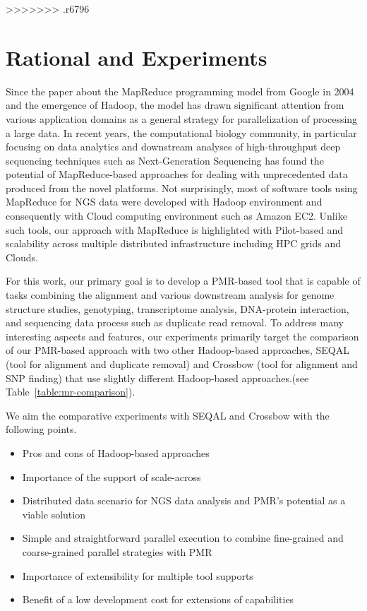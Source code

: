 \documentclass{sig-alternate}
\begin{document}
>>>>>>> .r6796
\section{Rational and Experiments}\label{sec:experiments}



Since the paper about the MapReduce programming model from Google in 2004\cite{mapreduce-2004-dean} and the emergence of Hadoop, the model has drawn significant attention from various application domains as a general strategy for parallelization of processing a large data.  In recent years, the computational biology community, in particular focusing on data analytics and downstream analyses of high-throughput deep sequencing techniques such as Next-Generation Sequencing has found the potential of MapReduce-based approaches for dealing with unprecedented data produced from the novel platforms\cite{schatz-nature-biotech-2010}.  Not surprisingly, most of software tools using MapReduce for NGS data were developed with Hadoop environment and consequently with Cloud computing environment such as Amazon EC2.  Unlike such tools, our approach with MapReduce is highlighted with Pilot-based and scalability across multiple distributed infrastructure including HPC grids and Clouds.  

For this work, our primary goal is to develop a PMR-based tool that is capable of tasks combining the alignment and various downstream analysis for genome structure studies, genotyping, transcriptome analysis, DNA-protein interaction, and sequencing data process such as duplicate read removal.  To address many interesting aspects and features, our experiments primarily target the comparison of our PMR-based approach with two other Hadoop-based approaches, SEQAL (tool for alignment and duplicate removal) and Crossbow (tool for alignment and SNP finding) that use slightly different Hadoop-based approaches.(see Table~\ref{table:mr-comparison}).  

We aim the comparative experiments with SEQAL and Crossbow with the following points.
\begin{itemize}
\item Pros and cons of Hadoop-based approaches
\item Importance of the support of scale-across 
\item Distributed data scenario for NGS data analysis and PMR's potential as a viable solution
\item Simple and straightforward parallel execution to combine fine-grained and coarse-grained parallel strategies with PMR 
\item Importance of extensibility for multiple tool supports
\item Benefit of a low development cost for extensions of capabilities 
\end{itemize}
\end{document}
